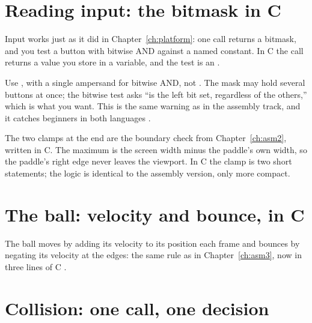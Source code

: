 \section{Reading input: the bitmask in C}

Input works just as it did in Chapter~\ref{ch:platform}: one call returns a
bitmask, and you test a button with bitwise AND against a named constant. In C the
call returns a value you store in a variable, and the test is an .



\begin{prgwarn}
Use , with a single ampersand for bitwise AND, not
. The mask may hold several buttons at once; the
bitwise test asks ``is the left bit set, regardless of the others,'' which is what
you want. This is the same warning as in the assembly track, and it catches
beginners in both languages \citep{prg32tutorialc}.
\end{prgwarn}

The two clamps at the end are the boundary check from Chapter~\ref{ch:asm2},
written in C. The maximum is the screen width minus the paddle's own width, so the
paddle's right edge never leaves the viewport. In C the clamp is two short
 statements; the logic is identical to the assembly version, only more
compact.

\section{The ball: velocity and bounce, in C}

The ball moves by adding its velocity to its position each frame and bounces by
negating its velocity at the edges: the same rule as in
Chapter~\ref{ch:asm3}, now in three lines of C \citep{prg32repo}.



\section{Collision: one call, one decision}

